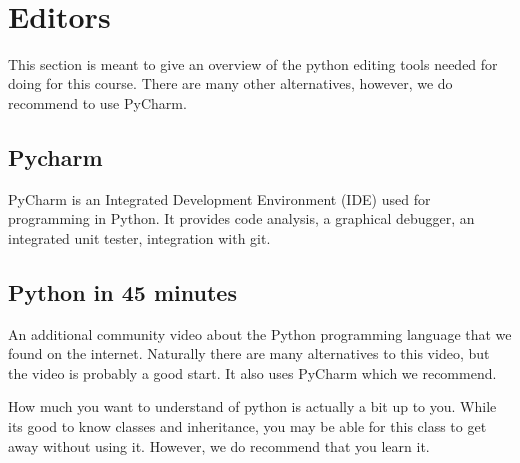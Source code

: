 \FILENAME\
\section{Editors}\label{introduction}

This section is meant to give an overview of the python editing tools needed for doing for this course. There are many other alternatives, however, we do recommend to use PyCharm.

\subsection{Pycharm}\label{s:pycharm}

PyCharm is an Integrated Development Environment (IDE) used for programming in
Python. It provides code analysis, a graphical debugger, an integrated
unit tester, integration with git.


\subsection{Python in 45 minutes}\label{python-in-45-minutes}

An additional community video about the Python programming language that
we found on the internet. Naturally there are many alternatives to this
video, but the video is probably a good start. It also uses PyCharm
which we recommend.


How much you want to understand of python is actually a bit up to you.
While its good to know classes and inheritance, you may be able for this
class to get away without using it. However, we do recommend that you
learn it.


